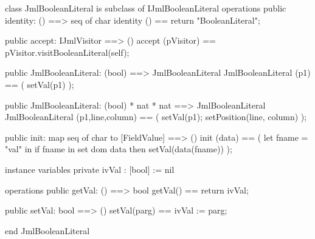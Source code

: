 \begin{vdm_al}
class JmlBooleanLiteral is subclass of IJmlBooleanLiteral
operations
  public identity: () ==> seq of char
  identity () == return "BooleanLiteral";

  public accept: IJmlVisitor ==> ()
  accept (pVisitor) == pVisitor.visitBooleanLiteral(self);

  public JmlBooleanLiteral:
    (bool) ==> JmlBooleanLiteral
  JmlBooleanLiteral (p1) == 
    ( setVal(p1) );

  public JmlBooleanLiteral:
    (bool) *
    nat *
    nat ==> JmlBooleanLiteral
  JmlBooleanLiteral (p1,line,column) == 
    ( setVal(p1);
      setPosition(line, column) );

  public init: map seq of char to [FieldValue] ==> ()
  init (data) ==
    ( let fname = "val" in
        if fname in set dom data
        then setVal(data(fname)) );

instance variables
  private ivVal : [bool] := nil

operations
  public getVal: () ==> bool
  getVal() == return ivVal;

  public setVal: bool ==> ()
  setVal(parg) == ivVal := parg;

end JmlBooleanLiteral
\end{vdm_al}

